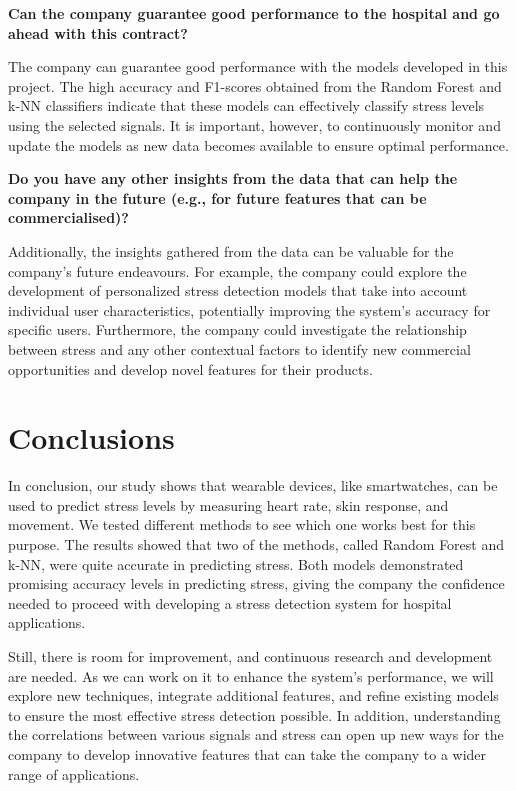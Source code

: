 \documentclass{article}
\begin{document}
\bigbreak

\noindent\textbf{Can the company guarantee good performance to the hospital
and go ahead with this contract?}

\noindent The company can guarantee good performance with the models developed in this project. The high accuracy and F1-scores obtained from the Random Forest and k-NN classifiers indicate that these models can effectively classify stress levels using the selected signals. It is important, however, to continuously monitor and update the models as new data becomes available to ensure optimal performance.

\bigbreak

\noindent\textbf{Do you have any other insights from the data that can help the company in the future (e.g.,
for future features that can be commercialised)?}

\noindent
Additionally, the insights gathered from the data can be valuable for the company's future endeavours. For example, the company could explore the development of personalized stress detection models that take into account individual user characteristics, potentially improving the system's accuracy for specific users. Furthermore, the company could investigate the relationship between stress and any other contextual factors to identify new commercial opportunities and develop novel features for their products.

\section{Conclusions}
In conclusion, our study shows that wearable devices, like smartwatches, can be used to predict stress levels by measuring heart rate, skin response, and movement. We tested different methods to see which one works best for this purpose. The results showed that two of the methods, called Random Forest and k-NN, were quite accurate in predicting stress. Both models demonstrated promising accuracy levels in predicting stress, giving the company the confidence needed to proceed with developing a stress detection system for hospital applications.

Still, there is room for improvement, and continuous research and development are needed. As we can work on it to enhance the system's performance, we will explore new techniques, integrate additional features, and refine existing models to ensure the most effective stress detection possible. In addition, understanding the correlations between various signals and stress can open up new ways for the company to develop innovative features that can take the company to a wider range of applications.
\end{document}

